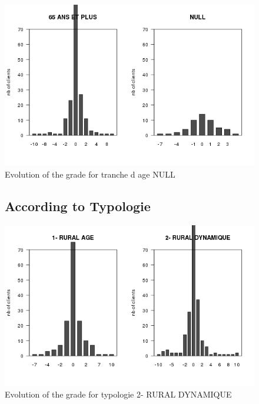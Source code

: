 \documentclass[a4paper, 11pt]{article}
\begin{document}
        \begin{figure}[!ht]
                \centering
                \includegraphics[height = 10 cm]{Remi/Evolution_of_the_grade_for_tranche_d_age_NULL.png}
                \caption{Evolution of the grade for tranche d age NULL}
                \label{fig:e_age_NULL}
        \end{figure}

        \begin{figure}[!ht]
				\subsection{According to Typologie}
                \centering
                \includegraphics[height = 10 cm]{Remi/Evolution_of_the_grade_for_typologie_2- RURAL DYNAMIQUE.png}
                \caption{Evolution of the grade for typologie 2- RURAL DYNAMIQUE}
                \label{fig:e_typo2}
        \end{figure}
\end{document}
